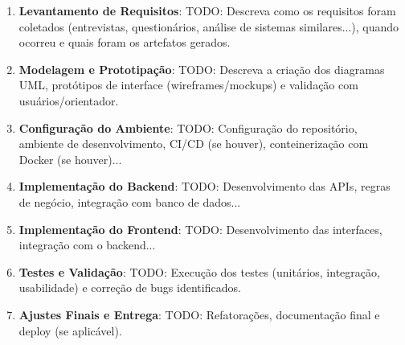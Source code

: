 \begin{enumerate}
  \item \textbf{Levantamento de Requisitos}:
        TODO: Descreva como os requisitos foram coletados (entrevistas,
        questionários, análise de sistemas similares...), quando ocorreu
        e quais foram os artefatos gerados.

  \item \textbf{Modelagem e Prototipação}:
        TODO: Descreva a criação dos diagramas UML, protótipos de
        interface (wireframes/mockups) e validação com usuários/orientador.

  \item \textbf{Configuração do Ambiente}:
        TODO: Configuração do repositório, ambiente de desenvolvimento,
        CI/CD (se houver), conteinerização com Docker (se houver)...

  \item \textbf{Implementação do Backend}:
        TODO: Desenvolvimento das APIs, regras de negócio, integração
        com banco de dados...

  \item \textbf{Implementação do Frontend}:
        TODO: Desenvolvimento das interfaces, integração com o backend...

  \item \textbf{Testes e Validação}:
        TODO: Execução dos testes (unitários, integração, usabilidade)
        e correção de bugs identificados.

  \item \textbf{Ajustes Finais e Entrega}:
        TODO: Refatorações, documentação final e deploy (se aplicável).
\end{enumerate}


